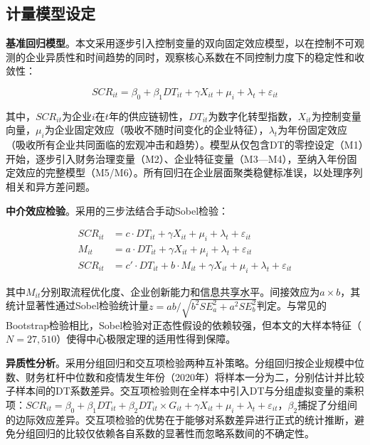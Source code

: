 \subsection{计量模型设定}

\textbf{基准回归模型}。本文采用逐步引入控制变量的双向固定效应模型，以在控制不可观测的企业异质性和时间趋势的同时，观察核心系数在不同控制力度下的稳定性和收敛性：

\begin{equation}
SCR_{it} = \beta_0 + \beta_1 DT_{it} + \gamma X_{it} + \mu_i + \lambda_t + \varepsilon_{it}
\label{eq:baseline}
\end{equation}

其中，$SCR_{it}$为企业$i$在$t$年的供应链韧性，$DT_{it}$为数字化转型指数，$X_{it}$为控制变量向量，$\mu_i$为企业固定效应（吸收不随时间变化的企业特征），$\lambda_t$为年份固定效应（吸收所有企业共同面临的宏观冲击和趋势）。模型从仅包含DT的零控设定（M1）开始，逐步引入财务治理变量（M2）、企业特征变量（M3—M4），至纳入年份固定效应的完整模型（M5/M6）。所有回归在企业层面聚类稳健标准误，以处理序列相关和异方差问题。

\textbf{中介效应检验}。采用\cite{baron1986moderator}的三步法结合手动Sobel检验：

\begin{align}
SCR_{it} &= c \cdot DT_{it} + \gamma X_{it} + \mu_i + \lambda_t + \varepsilon_{it} \label{eq:step1} \\
M_{it} &= a \cdot DT_{it} + \gamma X_{it} + \mu_i + \lambda_t + \varepsilon_{it} \label{eq:step2} \\
SCR_{it} &= c' \cdot DT_{it} + b \cdot M_{it} + \gamma X_{it} + \mu_i + \lambda_t + \varepsilon_{it} \label{eq:step3}
\end{align}

其中$M_{it}$分别取流程优化度、企业创新能力和信息共享水平。间接效应为$a \times b$，其统计显著性通过Sobel检验统计量$z = ab / \sqrt{b^2 SE_a^2 + a^2 SE_b^2}$判定。与常见的Bootstrap检验相比，Sobel检验对正态性假设的依赖较强，但本文的大样本特征（$N=27,510$）使得中心极限定理的适用性得到保障。

\textbf{异质性分析}。采用分组回归和交互项检验两种互补策略。分组回归按企业规模中位数、财务杠杆中位数和疫情发生年份（2020年）将样本一分为二，分别估计并比较子样本间的DT系数差异。交互项检验则在全样本中引入DT与分组虚拟变量的乘积项：$SCR_{it} = \beta_0 + \beta_1 DT_{it} + \beta_2 DT_{it} \times G_{it} + \gamma X_{it} + \mu_i + \lambda_t + \varepsilon_{it}$，$\beta_2$捕捉了分组间的边际效应差异。交互项检验的优势在于能够对系数差异进行正式的统计推断，避免分组回归的比较仅依赖各自系数的显著性而忽略系数间的不确定性。
